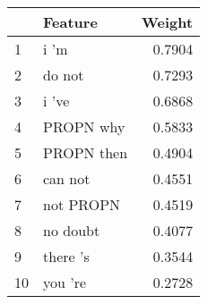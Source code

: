 \begin{tabular}{llr}
\toprule
{} &     Feature &  Weight \\
\midrule
1  &        i 'm &  0.7904 \\
2  &      do not &  0.7293 \\
3  &       i 've &  0.6868 \\
4  &   PROPN why &  0.5833 \\
5  &  PROPN then &  0.4904 \\
6  &     can not &  0.4551 \\
7  &   not PROPN &  0.4519 \\
8  &    no doubt &  0.4077 \\
9  &    there 's &  0.3544 \\
10 &     you 're &  0.2728 \\
\bottomrule
\end{tabular}
